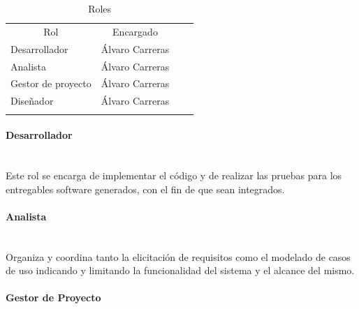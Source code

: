\documentclass[twoside]{report}
\begin{document}
\begin{table}[H]
\begin{tabular}{llll}
\cline{1-2}
\multicolumn{1}{|c|}{Rol} & \multicolumn{1}{c|}{Encargado} &  &  \\ \cline{1-2}
\multicolumn{1}{|l|}{Desarrollador}                                      & \multicolumn{1}{l|}{Álvaro Carreras}                                          &  &  \\ \cline{1-2}
\multicolumn{1}{|l|}{Analista}                                           & \multicolumn{1}{l|}{Álvaro Carreras}                                          &  &  \\ \cline{1-2}
\multicolumn{1}{|l|}{Gestor de proyecto}                                 & \multicolumn{1}{l|}{Álvaro Carreras}                                          &  &  \\ \cline{1-2}
\multicolumn{1}{|l|}{Diseñador}                                          & \multicolumn{1}{l|}{Álvaro Carreras}                                                         &  &  \\ \cline{1-2}
                                                                         &                                                                               &  & 
\end{tabular}
\centering
\caption{Roles}
\end{table}
\vspace{0.5cm}

\paragraph{Desarrollador}\mbox{}\\

Este rol se encarga de implementar el código y de realizar las pruebas para los entregables software generados, con el fin de que sean integrados.

\paragraph{Analista}\mbox{}\\

Organiza y coordina tanto la elicitación de requisitos como el modelado de casos de uso indicando y limitando la funcionalidad del sistema y el alcance del mismo.

\paragraph{Gestor de Proyecto}\mbox{}\\
\end{document}
